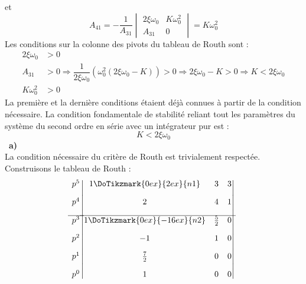 et
\[
A_{41}=-\dfrac{1}{A_{31}}
       \begin{vmatrix}
       2\xi\omega_0 & K\omega_0^2 \\
       A_{31} & 0
       \end{vmatrix}
      =K\omega_0^2
\]
Les conditions sur la colonne des pivots du tableau de Routh sont :
\begin{align*}
    2\xi\omega_0 &> 0 \\
    A_{31} &> 0 \Rightarrow \dfrac{1}{2\xi\omega_0}
    \left(\omega_0^2(2\xi\omega_0-K)\right) > 0 \Rightarrow 2\xi\omega_0-K > 0 
    \Rightarrow K < 2\xi\omega_0\\
    K\omega_0^2 &> 0 
\end{align*}
La première et la dernière conditions étaient déjà connues à partir de la 
condition nécessaire. La condition fondamentale de stabilité reliant tout 
les paramètres du système du second ordre 
en série avec un intégrateur pur est :
\[
K < 2\xi\omega_0
\]
\noindent~\textbf{a)}\\
La condition nécessaire du critère de Routh est trivialement respectée.
Construisons le tableau de Routh :
\[
\begin{matrix}
    p^5 \\[1em]
    p^4 \\[1em]
    \hline
    p^3 \\[1em]
    p^2 \\[1em]
    p^1 \\[1em]
    p^0 
\end{matrix}
\begin{vmatrix}
    1\DoTikzmark{0ex}{2ex}{n1}      & 3   & 3 \\[1em]
    2      & 4   & 1 \\[1em]
    \hline
    1\DoTikzmark{0ex}{-16ex}{n2}   & \frac{5}{2} & 0 \\[1em]
    -1                            & 1  & 0 \\[1em]
    \frac{7}{2}  & 0  &  0 \\[1em]
    1            & 0  &  0 
\end{vmatrix}
\]
